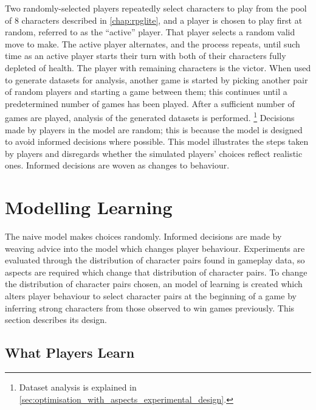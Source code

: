 Two randomly-selected players repeatedly select characters to play from the pool
of 8 characters described in \cref{chap:rpglite}, and a player is chosen to play
first at random, referred to as the ``active'' player. That player selects a
random valid move to make. The active player alternates, and the process
repeats, until such time as an active player starts their turn with both of
their characters fully depleted of health. The player with remaining characters
is the victor. When used to generate datasets for analysis, another game is
started by picking another pair of random players and starting a game between
them; this continues until a predetermined number of games has been played.
After a sufficient number of games are played, analysis of the generated datasets
is performed. \footnote{Dataset analysis is explained in
\cref{sec:optimisation_with_aspects_experimental_design}.}
Decisions made by players in the model are random; this is because the model is
designed to avoid informed decisions where possible. This model illustrates the
steps taken by players and disregards whether the simulated players' choices
reflect realistic ones. Informed decisions are woven as \aspectoriented{}
changes to behaviour.






\section{Modelling Learning}
\label{learning_model_definition}

The naive model makes choices randomly. Informed decisions are made by weaving
advice into the model which changes player behaviour. Experiments are evaluated
through the distribution of character pairs found in gameplay data, so aspects
are required which change that distribution of character pairs. To change the
distribution of character pairs chosen, an \aspectoriented{} model of learning
is created which alters player behaviour to select character pairs at the
beginning of a game by inferring strong characters from those observed to win
games previously. This section describes its design.

\subsection{What Players Learn}

